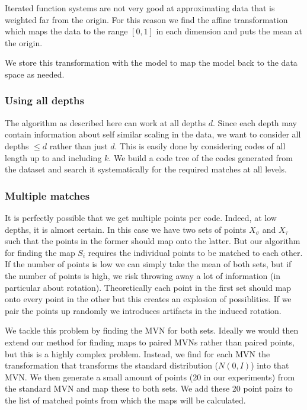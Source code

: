 \documentclass[10pt,a4paper,oneside]{article}
\theoremstyle{definition}
\begin{document}
Iterated function systems are not very good at approximating data that is weighted far from the origin. For this reason we find the affine transformation which maps the data to the range $[0,1]$ in each dimension and puts the mean at the origin.

We store this transformation with the model to map the model back to the data space as needed.

\subsubsection*{Using all depths}

The algorithm as described here can work at all depths $d$. Since each depth may contain information about self similar scaling in the data, we want to consider all depths $\leq d$ rather than just $d$. This is easily done by considering codes of all length up to and including $k$. We build a code tree of the codes generated from the dataset and search it systematically for the required matches at all levels.


\subsubsection*{Multiple matches}

It is perfectly possible that we get multiple points per code. Indeed, at low depths, it is almost certain. In this case we have two sets of points $X_\sigma$ and $X_\tau$ such that the points in the former should map onto the latter. But our algorithm for finding the map $S_i$ requires the individual points to be matched to each other. If the number of points is low we can simply take the mean of both sets, but if the number of points is high, we risk throwing away a lot of information (in particular about rotation). Theoretically each point in the first set should map onto every point in the other but this creates an explosion of possiblities. If we pair the points up randomly we introduces artifacts in the induced rotation.

We tackle this problem by finding the MVN for both sets. Ideally we would then extend our method for finding maps to paired MVNs rather than paired points, but this is a highly complex problem. Instead, we find for each MVN the transformation that transforms the standard distribution ($N(0, I)$) into that MVN. We then generate a small amount of points (20 in our experiments) from the standard MVN and map these to both sets. We add these 20 point pairs to the list of matched points from which the maps will be calculated. 
\end{document}
